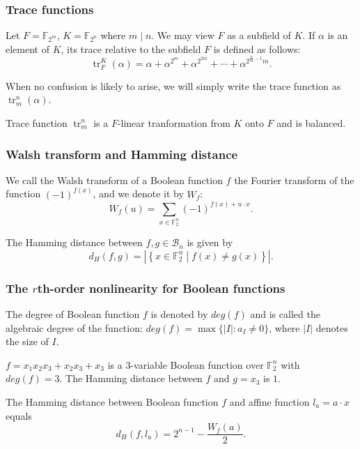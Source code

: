\documentclass[
    aspectratio=169,                   %
]{beamer}
\newcommand{\F}{\mathbb{F}}
\newcommand{\Bn}{\mathcal{B}_n}
\begin{document}
    \begin{frame}
        \frametitle{Trace functions}
    
        \begin{definition}
            Let $ F = \F_{2^m} $, $ K = \F_{2^n} $ where $ m\mid n $. We may view $ F $ as a subfield of $ K $. 
            If $ \alpha $ is an element of $ K $, its trace relative to the subfield $ F $ is defined as follows: 
            \[\operatorname{tr}_F^K(\alpha)=\alpha+\alpha^{2^m}+\alpha^{2^{2m}}+\cdots+\alpha^{2^{\frac{n}{m}-1}m}.\]
        \end{definition}
        When no confusion is likely to arise, we will simply write the trace function as $ \operatorname{tr}_m^n(\alpha) $.
        \begin{remark}
            Trace function $ \operatorname{tr}_m^n $ is a $ F $-linear tranformation from $ K $ onto $ F $ and is balanced.
        \end{remark}
    
    \end{frame}
    \begin{frame}
        \frametitle{Walsh transform and Hamming distance}
    
        \begin{definition}
            We call the Walsh transform of a Boolean function $f$ the Fourier transform of 
            the function $ (-1)^{f(x)} $, and we denote it by $ W_f $: 
            \[W_f(u) = \sum_{x\in\F_{2}^n}(-1)^{f(x)+u\cdot x}.\]
        \end{definition}
        \begin{definition}
            The Hamming distance between $f,g\in\Bn$ is given by \[ d_H(f,g) = |\left\{x\in\F_2^n\middle|f(x)\ne g(x)\right\}|.\]
        \end{definition}
    \end{frame}
    \begin{frame}
        \frametitle{The $ r $th-order nonlinearity for Boolean functions}
        
        \begin{definition}
            The degree of Boolean function $ f $ is denoted by $ deg(f) $ and is called the algebraic degree of the function: 
            $ deg(f) = \max\{|I|: a_I \ne 0\} $, where $ |I| $ denotes the size of $ I $.
        \end{definition}

        \begin{example}
            $ f=x_1x_2x_3+x_2x_3+x_3 $ is a $3$-variable Boolean function over $ \F_2^n $ with $ deg(f)=3 $.
            The Hamming distance between $ f $ and $ g=x_3 $ is $ 1 $.
        \end{example}
        \begin{remark}
            The Hamming distance between Boolean function $ f $ and affine function $ l_a=a\cdot x $ equals
            \[d_H(f,l_a)=2^{n-1}-\frac{W_f(a)}{2}.\]   
        \end{remark}
    \end{frame}
\end{document}
